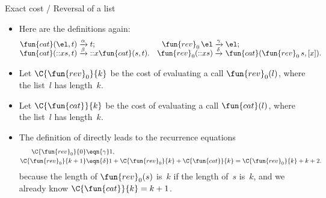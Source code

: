 %
\begin{frame}{Exact cost / Reversal of a list}

  \begin{itemize}

    \item Here are the definitions again:
      \begin{equation*}
        \begin{array}{@{}r@{\;}l@{\;}lr@{\;}l@{\;}l@{}}
          \fun{cat}(\el,t)
          & \xrightarrow{\alpha} & t;
          & \fun{rev}_0\,\el
          & \xrightarrow{\smash{\gamma}} & \el;\\
          \fun{cat}(\cons{x}{s},t)
          & \xrightarrow{\smash{\beta}} & \cons{x}{\fun{cat}(s,t)}.
          & \fun{rev}_0(\cons{x}{s})
          & \xrightarrow{\smash{\delta}} & \fun{cat}(\fun{rev}_0\,s, [x]).
        \end{array}
      \end{equation*}

    \item Let \(\C{\fun{rev}_0}{k}\) be the cost of evaluating a call
      \(\fun{rev}_0(l)\), where the list~\(l\) has length~\(k\).

    \item Let \(\C{\fun{cat}}{k}\) be the cost of evaluating a call
      \(\fun{cat}(l)\), where the list~\(l\) has length~\(k\).

    \item The definition of  directly leads to the
      recurrence equations
      \begin{align*}
        \C{\fun{rev}_0}{0}   & \eqn{\gamma} 1,\\
        \C{\fun{rev}_0}{k+1} & \eqn{\smash{\delta}} 1 +
        \C{\fun{rev}_0}{k} + \C{\fun{cat}}{k} = \C{\fun{rev}_0}{k} + k
        + 2.
      \end{align*}
      because the length of \(\fun{rev}_0(s)\) is~\(k\) if the length
      of~\(s\) is~\(k\), and we already know \(\C{\fun{cat}}{k} = k +
      1\).

  \end{itemize}

\end{frame}

